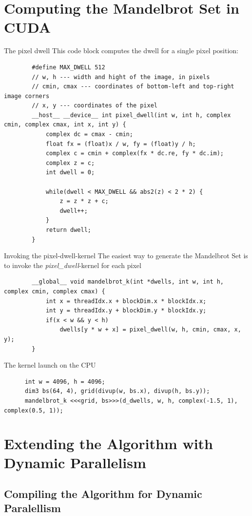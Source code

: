 \documentclass[fleqn,11pt,aspectratio=43]{beamer}
\begin{document}
\section{Computing the Mandelbrot Set in CUDA}

\begin{frame}[fragile]{The pixel dwell}
	This code block computes the dwell for a single pixel position:
	\begin{verbatim}
		#define MAX_DWELL 512
		// w, h --- width and hight of the image, in pixels
		// cmin, cmax --- coordinates of bottom-left and top-right image corners
		// x, y --- coordinates of the pixel
		__host__ __device__ int pixel_dwell(int w, int h, complex cmin, complex cmax, int x, int y) {
			complex dc = cmax - cmin;
			float fx = (float)x / w, fy = (float)y / h;
			complex c = cmin + complex(fx * dc.re, fy * dc.im);
			complex z = c; 
			int dwell = 0;
		
			while(dwell < MAX_DWELL && abs2(z) < 2 * 2) { 
				z = z * z + c;
				dwell++;
			}
			return dwell;
		}
	\end{verbatim}
\end{frame}

\begin{frame}[fragile]{Invoking the pixel-dwell-kernel}
	The easiest way to generate the Mandelbrot Set is to invoke the \textit{pixel\_dwell}-kernel for each pixel
	\begin{verbatim}
		__global__ void mandelbrot_k(int *dwells, int w, int h, complex cmin, complex cmax) {
			int x = threadIdx.x + blockDim.x * blockIdx.x;
			int y = threadIdx.y + blockDim.y * blockIdx.y;
			if(x < w && y < h)
				dwells[y * w + x] = pixel_dwell(w, h, cmin, cmax, x, y);
		}
	\end{verbatim}
	The kernel launch on the CPU
	\begin{verbatim}
	  int w = 4096, h = 4096;
	  dim3 bs(64, 4), grid(divup(w, bs.x), divup(h, bs.y));
	  mandelbrot_k <<<grid, bs>>>(d_dwells, w, h, complex(-1.5, 1), complex(0.5, 1));
	\end{verbatim}
\end{frame}

\section{Extending the Algorithm with Dynamic Parallelism}

\subsection{Compiling the Algorithm for Dynamic Paralellism}
\end{document}
